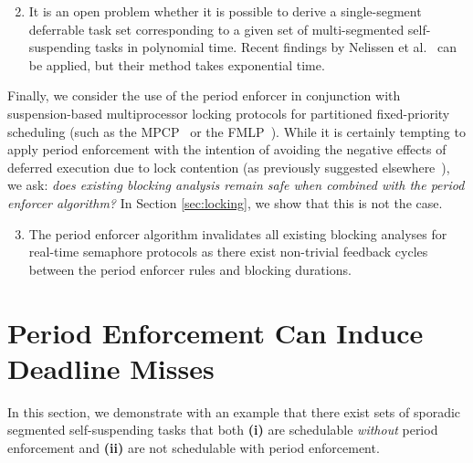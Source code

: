 \begin{enumerate}
\setcounter{enumi}{1}
	\item It is an open problem whether it is possible to derive a single-segment deferrable task set corresponding to a given set of  multi-segmented self-suspending tasks in polynomial time. Recent findings by Nelissen et al.~\cite{ecrts15nelissen} can be applied, but their method takes exponential time.
\end{enumerate}

Finally, we consider the use of the period enforcer in conjunction with suspension-based multiprocessor locking protocols for partitioned fixed-priority scheduling (such as the MPCP~\cite{LNR:09,Ra:90} or the FMLP~\cite{BLBA:07,BA:08}). While it is certainly tempting to apply period enforcement with the intention of avoiding the negative effects of deferred execution due to lock contention (as previously suggested elsewhere~\cite{Raj:91,Lak:11,LNR:09}), we ask: \emph{does existing blocking analysis remain safe when combined with the period enforcer algorithm?} In Section \ref{sec:locking}, we show that this is not the case.

\begin{enumerate}
\setcounter{enumi}{2}
	\item The period enforcer algorithm invalidates all existing blocking analyses for real-time semaphore protocols as there exist non-trivial feedback cycles between the period enforcer rules and blocking durations.
\end{enumerate}



\section{Period Enforcement Can Induce Deadline Misses}
\label{sec:unschedulable}

In this section, we demonstrate with an example that there exist sets of sporadic  segmented self-suspending tasks that both \textbf{(i)} are schedulable \emph{without} period enforcement and \textbf{(ii)} are not schedulable with period enforcement.

